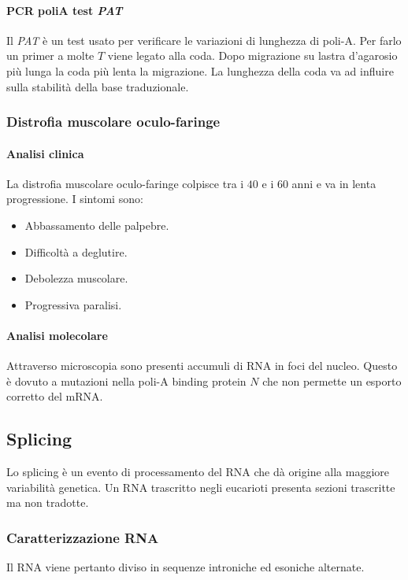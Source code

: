 			\paragraph{PCR poliA test \emph{PAT}}
			Il \emph{PAT} \`e un test usato per verificare le variazioni di lunghezza di poli-A.
			Per farlo un primer a molte $T$ viene legato alla coda.
			Dopo migrazione su lastra d'agarosio pi\`u lunga la coda pi\`u lenta la migrazione.
			La lunghezza della coda va ad influire sulla stabilit\`a della base traduzionale.

		\subsubsection{Distrofia muscolare oculo-faringe}
	
			\paragraph{Analisi clinica}
			La distrofia muscolare oculo-faringe colpisce tra i $40$ e i $60$ anni e va in lenta progressione.
			I sintomi sono:
			\begin{multicols}{2}
				\begin{itemize}
					\item Abbassamento delle palpebre.
					\item Difficolt\`a a deglutire.
					\item Debolezza muscolare.
					\item Progressiva paralisi.
				\end{itemize}
			\end{multicols}

			\paragraph{Analisi molecolare}
			Attraverso microscopia sono presenti accumuli di RNA in foci del nucleo.
			Questo \`e dovuto a mutazioni nella poli-A binding protein $N$ che non permette un esporto corretto del mRNA.

		
	\subsection{Splicing}
	Lo splicing \`e un evento di processamento del RNA che d\`a origine alla maggiore variabilit\`a genetica.
	Un RNA trascritto negli eucarioti presenta sezioni trascritte ma non tradotte.

		\subsubsection{Caratterizzazione RNA}
		Il RNA viene pertanto diviso in sequenze introniche ed esoniche alternate.
			
